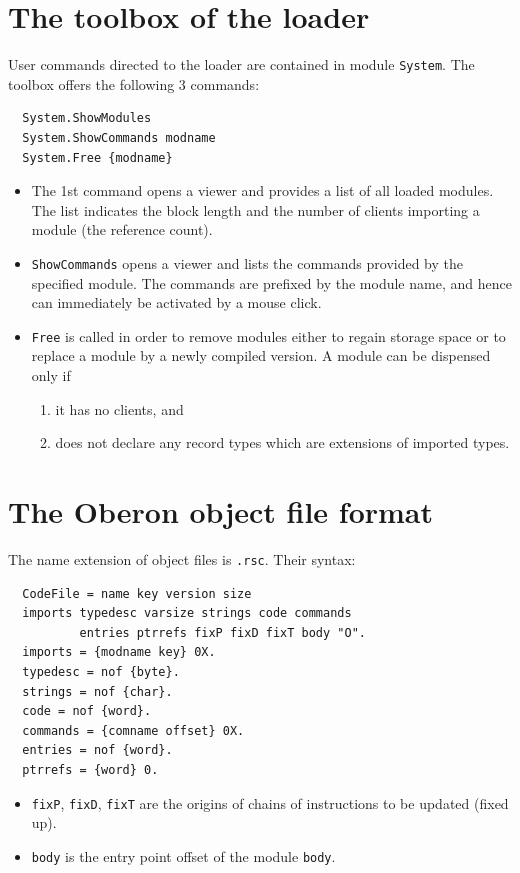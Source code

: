 \section{The toolbox of the loader}
User commands directed to the loader are contained in module \verb|System|.
The toolbox offers the following 3 commands:
\begin{verbatim}
  System.ShowModules
  System.ShowCommands modname
  System.Free {modname}
\end{verbatim}
\begin{itemize}
  \item The 1st command opens a viewer and provides a list of all loaded modules.
    The list indicates the block length and the number of clients importing a module
    (the reference count).
  \item \verb|ShowCommands| opens a viewer and lists the commands provided by the specified module.
    The commands are prefixed by the module name,
    and hence can immediately be activated by a mouse click.
  \item \verb|Free| is called in order to remove modules either to regain storage space or
    to replace a module by a newly compiled version.
    A module can be dispensed only if
    \begin{enumerate}
      \item it has no clients, and
      \item does not declare any record types which are extensions of imported types.
    \end{enumerate}
\end{itemize}

\section{The Oberon object file format}
The name extension of object files is \verb|.rsc|.  Their syntax:
\begin{verbatim}
  CodeFile = name key version size
  imports typedesc varsize strings code commands
          entries ptrrefs fixP fixD fixT body "O".
  imports = {modname key} 0X.
  typedesc = nof {byte}.
  strings = nof {char}.
  code = nof {word}.
  commands = {comname offset} 0X.
  entries = nof {word}.
  ptrrefs = {word} 0.
\end{verbatim}
\begin{itemize}
  \item \verb|fixP|, \verb|fixD|, \verb|fixT| are the origins of chains of instructions to be updated (fixed up).
  \item \verb|body| is the entry point offset of the module \verb|body|.
\end{itemize}
